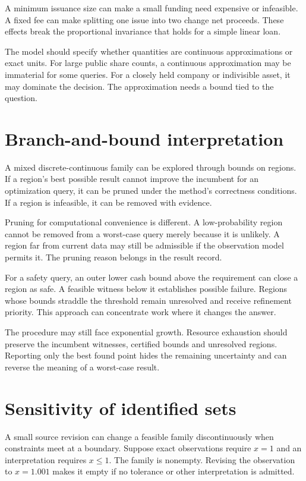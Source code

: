 A minimum issuance size can make a small funding need expensive or infeasible. A fixed fee can make splitting one issue into two change net proceeds. These effects break the proportional invariance that holds for a simple linear loan.

The model should specify whether quantities are continuous approximations or exact units. For large public share counts, a continuous approximation may be immaterial for some queries. For a closely held company or indivisible asset, it may dominate the decision. The approximation needs a bound tied to the question.

\section{Branch-and-bound interpretation}
A mixed discrete-continuous family can be explored through bounds on regions. If a region's best possible result cannot improve the incumbent for an optimization query, it can be pruned under the method's correctness conditions. If a region is infeasible, it can be removed with evidence.

Pruning for computational convenience is different. A low-probability region cannot be removed from a worst-case query merely because it is unlikely. A region far from current data may still be admissible if the observation model permits it. The pruning reason belongs in the result record.

For a safety query, an outer lower cash bound above the requirement can close a region as safe. A feasible witness below it establishes possible failure. Regions whose bounds straddle the threshold remain unresolved and receive refinement priority. This approach can concentrate work where it changes the answer.

The procedure may still face exponential growth. Resource exhaustion should preserve the incumbent witnesses, certified bounds and unresolved regions. Reporting only the best found point hides the remaining uncertainty and can reverse the meaning of a worst-case result.

\section{Sensitivity of identified sets}
A small source revision can change a feasible family discontinuously when constraints meet at a boundary. Suppose exact observations require $x=1$ and an interpretation requires $x\leq1$. The family is nonempty. Revising the observation to $x=1.001$ makes it empty if no tolerance or other interpretation is admitted.

